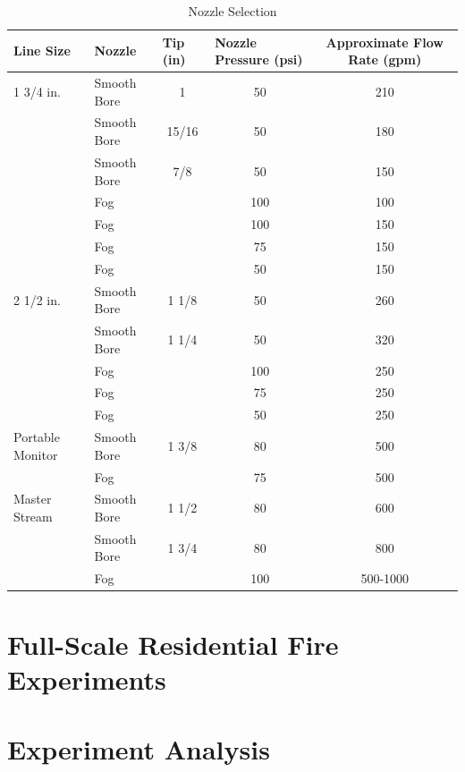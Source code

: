 \documentclass{article}
\begin{document}
\begin{table}[]
\centering
\begin{tabular}{|llccc|}
\hline
\multicolumn{1}{|l|}{\textbf{Line Size}} & \multicolumn{1}{l|}{\textbf{Nozzle}} & \multicolumn{1}{l|}{\textbf{Tip (in)}} & \multicolumn{1}{l|}{\textbf{Nozzle Pressure (psi)}} & \textbf{Approximate Flow Rate (gpm)} \\ \hline
1 3/4 in. & Smooth Bore & 1 & 50 & 210 \\
 & Smooth Bore & 15/16 & 50 & 180 \\
 & Smooth Bore & 7/8 & 50 & 150 \\
 & Fog &  & 100 & 100 \\
 & Fog &  & 100 & 150 \\
 & Fog &  & 75 & 150 \\
 & Fog &  & 50 & 150 \\ \hline
2 1/2 in. & Smooth Bore & 1 1/8 & 50 & 260 \\
 & Smooth Bore & 1 1/4 & 50 & 320 \\
 & Fog &  & 100 & 250 \\
 & Fog &  & 75 & 250 \\
 & Fog &  & 50 & 250 \\ \hline
Portable Monitor & Smooth Bore & 1 3/8 & 80 & 500 \\
 & Fog &  & 75 & 500 \\ \hline
Master Stream & Smooth Bore & 1 1/2 & 80 & 600 \\
 & Smooth Bore & 1 3/4 & 80 & 800 \\
 & Fog &  & 100 & 500-1000 \\ \hline
\end{tabular}
\caption{Nozzle Selection}
\label{Nozzle Selection}
\end{table}

\clearpage

\section{Full-Scale Residential Fire Experiments}

\clearpage

\section{Experiment Analysis}


\vspace*{\baselineskip}

\clearpage
\end{document}
